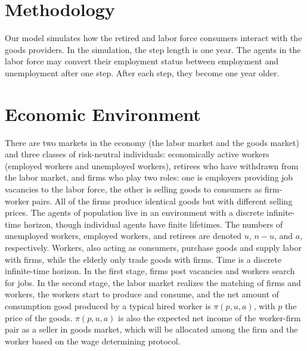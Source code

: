 \documentclass[ %
    final,
    scrbook,
    listoffigures,
    listoftables, 
    glossary]{cu-thesis}
\begin{document}
\section{Methodology}
Our model simulates how the retired and labor force consumers interact with the goods providers. In the simulation, the step length is one year. The agents in the labor force may convert their employment status between employment and unemployment after one step. After each step, they become one year older.
\section{Economic Environment}
There are two markets in the economy (the labor market and the goods market) and three classes of risk-neutral individuals: economically active workers (employed workers and unemployed workers), retirees who have withdrawn from the labor market, and firms who play two roles: one is employers providing job vacancies to the labor force, the other is selling goods to consumers as firm-worker pairs. All of the firms produce identical goods but with different selling prices. The agents of population live in an environment with a discrete infinite-time horizon, though individual agents have finite lifetimes. The numbers of unemployed workers, employed workers, and retirees are denoted $u$, $n-u$, and $a$, respectively. Workers, also acting as consumers, purchase goods and supply labor with firms, while the elderly only trade goods with firms. Time is a discrete infinite-time horizon. In the first stage, firms post vacancies and workers search for jobs. In the second stage, the labor market realizes the matching of firms and workers, the workers start to produce and consume, and the net amount of consumption good produced by a typical hired worker is $\pi(p,u,a)$, with $p$ the price of the goods. $\pi(p,u,a)$ is also the expected net income of the worker-firm pair as a seller in goods market, which will be allocated among the firm and the worker based on the wage determining protocol. \par 
\end{document}
